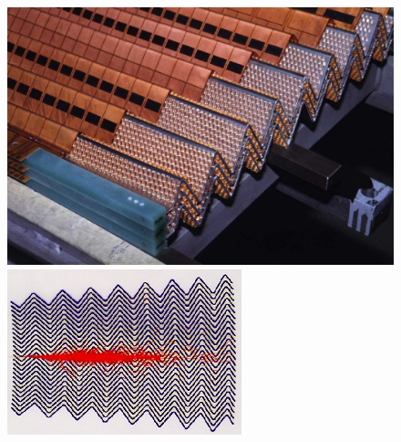 \begin{figure}[htp]
\begin{minipage}[b]{.59\textwidth}
    \begin{center}
    \includegraphics[width=\textwidth]{larpic}\makebox[0em][r]{\textcolor{natgreen}{\rule{\textwidth}{1pt}}}
    \end{center}
\end{minipage}
\begin{minipage}[b]{.4\textwidth}
    \begin{center}
    \includegraphics[width=\textwidth]{shower}\makebox[0em][r]{\textcolor{natgreen}{\rule{\textwidth}{1pt}}}
    \end{center}
\end{minipage}

\begin{minipage}[t]{.59\textwidth}
    \begin{center}
    \end{center}
\end{minipage}
~\begin{minipage}[t]{.4\textwidth}
    \begin{center}
    \end{center}
\end{minipage}


\end{figure}
